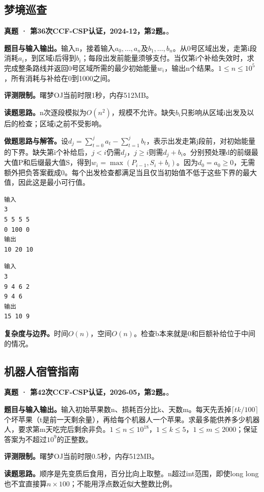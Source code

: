 \subsection{梦境巡查}
\textbf{真题 · 第36次CCF-CSP认证，2024-12，第2题。}。

\noindent\textbf{题目与输入输出。}输入n，接着输入$a_0,\ldots,a_n$及$b_1,\ldots,b_n$。从0号区域出发，走第i段消耗$a_i$，到区域i后得到$b_i$；每段出发前能量须够支付。当仅第i个补给失效时，求完成整条路线并返回0号区域所需的最少初始能量$w_i$，输出n个结果。$1\le n\le10^5$，所有消耗与补给在0到1000之间。

\noindent\textbf{评测限制。}曙梦OJ当前时限1秒，内存512MB。

\noindent\textbf{读题思路。}n次逐段模拟为$O(n^2)$，规模不允许。缺失$b_i$只影响从区域i出发及以后的检查；区域i之前不受影响。

\noindent\textbf{做题思路与解答。}设$d_j=\sum_{t=0}^j a_t-\sum_{t=1}^j b_t$，表示出发走第j段前，对初始能量的下界。缺失第i个补给后，$j<i$仍需$d_j$，$j\ge i$则需$d_j+b_i$。分别预处理d的前缀最大值P和后缀最大值S，得到$w_i=\max(P_{i-1},S_i+b_i)$。因为$d_0=a_0\ge0$，无需额外把负答案截成0。每个出发检查都满足当且仅当初始值不低于这些下界的最大值，因此这是最小可行值。
\begin{verbatim}
输入
3
5 5 5 5
0 100 0
输出
10 20 10
\end{verbatim}
\begin{verbatim}
输入
3
9 4 6 2
9 4 6
输出
15 10 9
\end{verbatim}

\noindent\textbf{复杂度与边界。}时间$O(n)$，空间$O(n)$。检查b本来就是0和巨额补给位于中间的情况。
\subsection{机器人宿管指南}
\textbf{真题 · 第42次CCF-CSP认证，2026-05，第2题。}。

\noindent\textbf{题目与输入输出。}输入初始苹果数n、损耗百分比k、天数m。每天先丢掉$\lceil tk/100\rceil$个坏苹果（t是前一天剩余量），再给每个机器人一个苹果。求最多能供养多少机器人，要求第m天吃完后剩余非负。$1\le n\le10^{18}$，$1\le k\le5$，$1\le m\le2000$；保证答案为不超过$10^9$的正整数。

\noindent\textbf{评测限制。}曙梦OJ当前时限0.5秒，内存512MB。

\noindent\textbf{读题思路。}顺序是先变质后食用，百分比向上取整。n超过int范围，即使long long也不宜直接算$n\times100$；不能用浮点数近似大整数比例。

